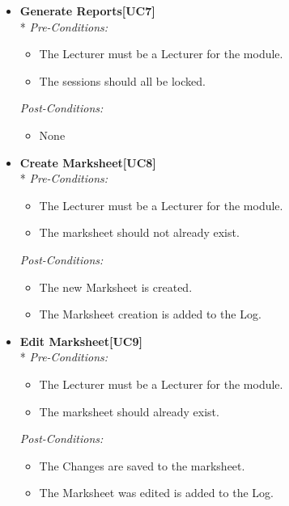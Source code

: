 \documentclass[a4paper]{article}
\begin{document}
\begin{itemize}
				\item	\textbf{Generate Reports[UC7]}\\*
						\textit{Pre-Conditions:}
								\begin{itemize}
									\item The Lecturer must be a Lecturer for the module.
									\item The sessions should all be locked.
								\end{itemize}
								
						\textit{Post-Conditions:}
								\begin{itemize}
									\item None
								\end{itemize}
														
				\item	\textbf{Create Marksheet[UC8]}\\*
						\textit{Pre-Conditions:}
								\begin{itemize}
									\item The Lecturer must be a Lecturer for the module.
									\item The marksheet should not already exist.
								\end{itemize}
								
						\textit{Post-Conditions:}
								\begin{itemize}
									\item The new Marksheet is created.
									\item The Marksheet creation is added to the Log.
								\end{itemize}
														
				\item	\textbf{Edit Marksheet[UC9]}\\*
						\textit{Pre-Conditions:}
								\begin{itemize}
									\item The Lecturer must be a Lecturer for the module.
									\item The marksheet should already exist.
								\end{itemize}
								
						\textit{Post-Conditions:}
								\begin{itemize}
									\item The Changes are saved to the marksheet.
									\item The Marksheet was edited is added to the Log.
								\end{itemize}
														

\end{itemize}
\end{document}
